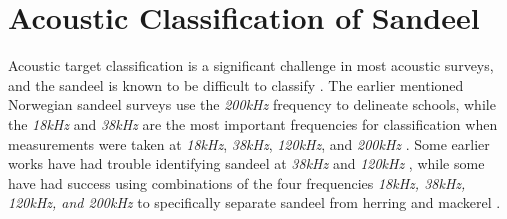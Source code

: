     

    
        

\section{Acoustic Classification of Sandeel} \label{acoustic classification sandeel}

    Acoustic target classification is a significant challenge in most acoustic surveys, and the sandeel is known to be difficult to classify \cite{sizedependentfreqrespons2009johnsen,johnsen2017collective}.  The earlier mentioned Norwegian sandeel surveys use the \textit{200kHz} frequency to delineate schools, while the \textit{18kHz} and \textit{38kHz} are the most important frequencies for classification when measurements were taken at \textit{18kHz}, \textit{38kHz}, \textit{120kHz}, and \textit{200kHz} \cite{sizedependentfreqrespons2009johnsen}. Some earlier works have had trouble identifying sandeel at \textit{38kHz} and \textit{120kHz} \cite{hassel2004influence,mackinson2005using,mosteiro2004dual}, while some have had success using combinations of the four frequencies \textit{18kHz, 38kHz, 120kHz, and 200kHz} to specifically separate sandeel from herring and mackerel \cite{mohammed2006acoustic}. 

